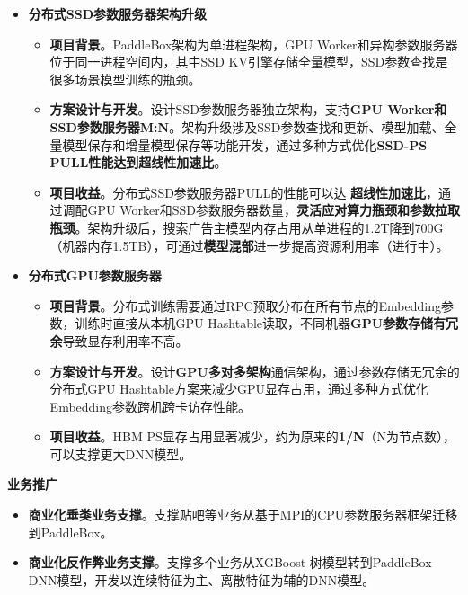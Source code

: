 \documentclass{resume}
\begin{document}
\begin{onehalfspacing}
\begin{itemize}
\item \textbf{分布式SSD参数服务器架构升级}
\begin{itemize}
\item \textbf{项目背景}。PaddleBox架构为单进程架构，GPU Worker和异构参数服务器位于同一进程空间内，其中SSD KV引擎存储全量模型，SSD参数查找是很多场景模型训练的瓶颈。%
\item \textbf{方案设计与开发}。设计SSD参数服务器独立架构，支持\textbf{GPU Worker和SSD参数服务器M:N}。架构升级涉及SSD参数查找和更新、模型加载、全量模型保存和增量模型保存等功能开发，通过多种方式优化\textbf{SSD-PS PULL性能达到超线性加速比}。%
\item \textbf{项目收益}。分布式SSD参数服务器PULL的性能可以达 \textbf{超线性加速比}，通过调配GPU Worker和SSD参数服务器数量，\textbf{灵活应对算力瓶颈和参数拉取瓶颈}。架构升级后，搜索广告主模型内存占用从单进程的1.2T降到700G（机器内存1.5TB），可通过\textbf{模型混部}进一步提高资源利用率（进行中）。%
\end{itemize}

\item \textbf{分布式GPU参数服务器}
\begin{itemize}
\item \textbf{项目背景}。分布式训练需要通过RPC预取分布在所有节点的Embedding参数，训练时直接从本机GPU Hashtable读取，不同机器\textbf{GPU参数存储有冗余}导致显存利用率不高。
\item \textbf{方案设计与开发}。设计\textbf{GPU多对多架构}通信架构，通过参数存储无冗余的分布式GPU Hashtable方案来减少GPU显存占用，通过多种方式优化Embedding参数跨机跨卡访存性能。
\item \textbf{项目收益}。HBM PS显存占用显著减少，约为原来的\textbf{1/N}（N为节点数），可以支撑更大DNN模型。
\end{itemize}

\end{itemize}

\textbf{业务推广} 
\begin{itemize}%
 \item \textbf{商业化垂类业务支撑}。支撑贴吧等业务从基于MPI的CPU参数服务器框架迁移到PaddleBox。
 \item \textbf{商业化反作弊业务支撑}。支撑多个业务从XGBoost 树模型转到PaddleBox DNN模型，开发以连续特征为主、离散特征为辅的DNN模型。
\end{itemize}

\end{onehalfspacing}
\end{document}
